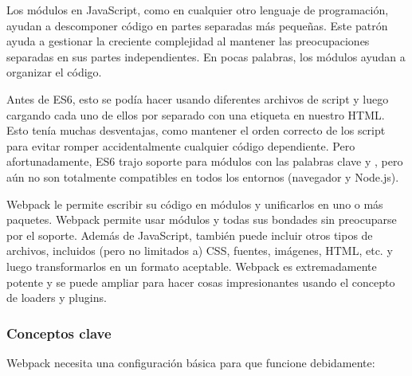 Los módulos en JavaScript, como en cualquier otro lenguaje de programación, ayudan a descomponer código en partes separadas más pequeñas. Este patrón ayuda a gestionar la creciente complejidad al mantener las preocupaciones separadas en sus partes independientes. En pocas palabras, los módulos ayudan a organizar el código.
\vspace{0.8cm}

Antes de ES6, esto se podía hacer usando diferentes archivos de \gls{script} y luego cargando cada uno de ellos por separado con una etiqueta  en nuestro HTML. Esto tenía muchas desventajas, como mantener el orden correcto de los \gls{script} para evitar romper accidentalmente cualquier código dependiente. Pero afortunadamente, ES6 trajo soporte para módulos con las palabras clave  y , pero aún no son totalmente compatibles en todos los entornos (navegador y Node.js).
\vspace{0.8cm}

Webpack le permite escribir su código en módulos y unificarlos en uno o más paquetes. Webpack permite usar módulos y todas sus bondades sin preocuparse por el soporte. Además de JavaScript, también puede incluir otros tipos de archivos, incluidos (pero no limitados a) CSS, fuentes, imágenes, HTML, etc. y luego transformarlos en un formato aceptable. Webpack es extremadamente potente y se puede ampliar para hacer cosas impresionantes usando el concepto de loaders y \glspl{plugin}.
\vspace{0.8cm}

\subsubsection{Conceptos clave}
Webpack necesita una configuración básica para que funcione debidamente:

